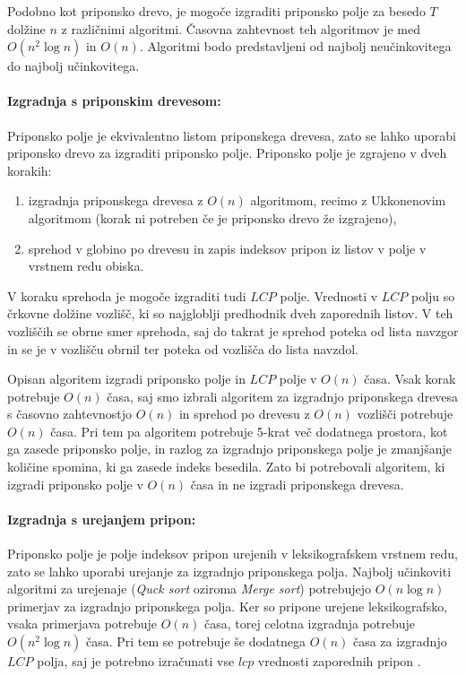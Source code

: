 Podobno kot priponsko drevo, je mogoče izgraditi priponsko polje za besedo $T$ dolžine $n$ z različnimi algoritmi. Časovna zahtevnost teh algoritmov je med $O(n^2\log{n})$ in $O(n)$. Algoritmi bodo predstavljeni od najbolj neučinkovitega do najbolj učinkovitega.

\paragraph{Izgradnja s priponskim drevesom:}
Priponsko polje je ekvivalentno listom priponskega drevesa, zato se lahko uporabi priponsko drevo za izgraditi priponsko polje. Priponsko polje je zgrajeno v dveh korakih:
\begin{enumerate}
    \item izgradnja priponskega drevesa z $O(n)$ algoritmom, recimo z Ukkonenovim algoritmom (korak ni potreben če je priponsko drevo že izgrajeno),
    \item sprehod v globino po drevesu in zapis indeksov pripon iz listov v polje v vrstnem redu obiska.
\end{enumerate}
V koraku sprehoda je mogoče izgraditi tudi $LCP$ polje. Vrednosti v $LCP$ polju so črkovne dolžine vozlišč, ki so najgloblji predhodnik dveh zaporednih listov. V teh vozliščih se obrne smer sprehoda, saj do takrat je sprehod poteka od lista navzgor in se je v vozlišču obrnil ter poteka od vozlišča do lista navzdol.

Opisan algoritem izgradi priponsko polje in $LCP$ polje v $O(n)$ časa. Vsak korak potrebuje $O(n)$ časa, saj smo izbrali algoritem za izgradnjo priponskega drevesa s časovno zahtevnostjo $O(n)$ in sprehod po drevesu z $O(n)$ vozlišči potrebuje $O(n)$ časa. Pri tem pa algoritem potrebuje 5-krat več dodatnega prostora, kot ga zasede priponsko polje, in razlog za izgradnjo priponskega polje je zmanjšanje količine spomina, ki ga zasede indeks besedila. Zato bi potrebovali algoritem, ki izgradi priponsko polje v $O(n)$ časa in ne izgradi priponskega drevesa.

\paragraph{Izgradnja s urejanjem pripon:}
Priponsko polje je polje indeksov pripon urejenih v leksikografskem vrstnem redu, zato se lahko uporabi urejanje za izgradnjo priponskega polja. Najbolj učinkoviti algoritmi za urejenaje (\textit{Quck sort} oziroma \textit{Merge sort}) potrebujejo $O(n\log{n})$ primerjav za izgradnjo priponskega polja. Ker so pripone urejene leksikografsko, vsaka primerjava potrebuje $O(n)$ časa, torej celotna izgradnja potrebuje $O(n^2\log{n})$ časa. Pri tem se potrebuje še dodatnega $O(n)$ časa za izgradnjo $LCP$ polja, saj je potrebno izračunati vse $lcp$ vrednosti zaporednih pripon \cite{Kasai2001}.

